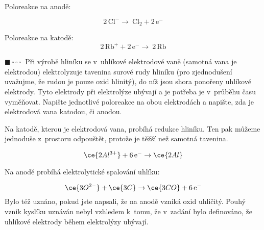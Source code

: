 \documentclass{book}
\newcommand{\jeden}{$\blacksquare \, \square \, \square \, \square \; \; $}
\renewenvironment{quotation}{\par}{\par} %
\begin{document}
Poloreakce na anodě: 

\[
\mathrm{2\,Cl^{-}\rightarrow\ Cl_{2}+2\,e^{-}}
\]

Poloreakce na katodě:
\[
\mathrm{2\,Rb^{+}+2\,e^{-}\rightarrow\ 2\,Rb}
\]


\hrulefill %
\begin{quotation}
\jeden Při výrobě hliníku se v~uhlíkové elektrodové vaně (samotná vana je
elektrodou) elektrolyzuje tavenina surové rudy hliníku (pro zjednodušení
uvažujme, že rudou je pouze oxid hlinitý), do níž jsou shora ponořeny
uhlíkové elektrody. Tyto elektrody při elektrolýze ubývají a je potřeba
je v~průběhu času vyměňovat. Napište jednotlivé poloreakce na obou
elektrodách a napište, zda je elektrodová vana katodou, či anodou.
\end{quotation} \dotfill \par 
Na katodě, kterou je elektrodová vana, probíhá redukce hliníku. Ten
pak můžeme jednoduše z~prostoru odpouštět, protože je těžší než samotná
tavenina.

\[
\ce{2Al^{3+}}+6\,\mathrm{e^{-}}\rightarrow\ce{2Al}
\]

Na anodě probíhá elektrolytické spalování uhlíku:

\[
\ce{3O^{2-}}+\ce{3C}\rightarrow\ce{3CO}+6\,\mathrm{e^{-}}
\]
Bylo též uznáno, pokud jste napsali, že na anodě vzniká oxid uhličitý.
Pouhý vznik kyslíku uznáván nebyl vzhledem k~tomu, že v~zadání bylo
definováno, že uhlíkové elektrody během elektrolýzy ubývají.
\end{document}
